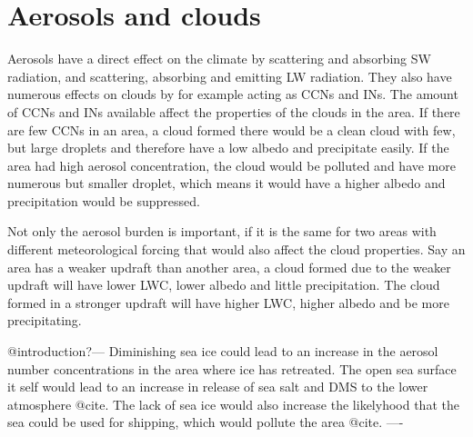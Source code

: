 


\section{Aerosols and clouds}%
Aerosols have a direct effect on the climate by scattering and absorbing SW radiation, and scattering, absorbing and emitting LW radiation.%
They also have numerous effects on clouds by for example acting as CCNs and INs. The amount of CCNs and INs available affect the properties of the clouds in the area.
If there are few CCNs in an area, a cloud formed there would be a clean cloud with few, but large droplets and therefore have a low albedo and precipitate easily. If the area had high aerosol concentration, the cloud would be polluted and have more numerous but smaller droplet, which means it would have a higher albedo and precipitation would be suppressed. 

Not only the aerosol burden is important, if it is the same for two areas with different meteorological forcing that would also affect the cloud properties. Say an area has a weaker updraft than another area, a cloud formed due to the weaker updraft will have lower LWC, lower albedo and little precipitation. The cloud formed in a stronger updraft will have higher LWC, higher albedo and be more precipitating.

@introduction?---
Diminishing sea ice could lead to an increase in the aerosol number concentrations in the area where ice has retreated. The open sea surface it self would lead to an increase in release of sea salt and DMS to the lower atmosphere @cite. The lack of sea ice would also increase the likelyhood that the sea could be used for shipping, which would pollute the area @cite.
----

